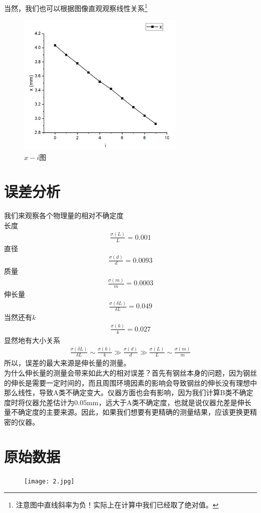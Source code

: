 \documentclass[a4paper]{ctexart}
\begin{document}
	当然，我们也可以根据图像直观观察线性关系\footnote{注意图中直线斜率为负！实际上在计算中我们已经取了绝对值。}
	\begin{figure}[H]
		\centering
		\includegraphics[width=8cm]{1.png}
		\caption{$x-i$图}
	\end{figure}
	\section{误差分析}
	我们来观察各个物理量的相对不确定度\\
	长度
	\begin{align}
		\frac{\sigma(L)}{L}=0.001
	\end{align}
	直径
	\begin{align}
		\frac{\sigma(d)}{d}=0.0093
	\end{align}
	质量
	\begin{align}
		\frac{\sigma(m)}{m}=0.0003
	\end{align}
	伸长量
	\begin{align}
		\frac{\sigma(\delta L)}{\delta L}=0.049
	\end{align}
	当然还有$k$
	\begin{align}
		\frac{\sigma(k)}{k}=0.027
	\end{align}
	显然地有大小关系
	\begin{align}
		\frac{\sigma(\delta L)}{\delta L}\sim\frac{\sigma(k)}{k}\gg\frac{\sigma(d)}{d}\gg\frac{\sigma(L)}{L}\sim\frac{\sigma(m)}{m}
	\end{align}
	所以，误差的最大来源是伸长量的测量。\\
	为什么伸长量的测量会带来如此大的相对误差？首先有钢丝本身的问题，因为钢丝的伸长是需要一定时间的，而且周围环境因素的影响会导致钢丝的伸长没有理想中那么线性，导致A类不确定变大。仪器方面也会有影响，因为我们计算B类不确定度时将仪器允差估计为$0.05\mathrm{mm}$，远大于A类不确定度，也就是说仪器允差是伸长量不确定度的主要来源。因此，如果我们想要有更精确的测量结果，应该更换更精密的仪器。
	\section{原始数据}
	\begin{figure}[H]
		\centering
		\texttt{[image: 2.jpg]}
	\end{figure}
\end{document}
